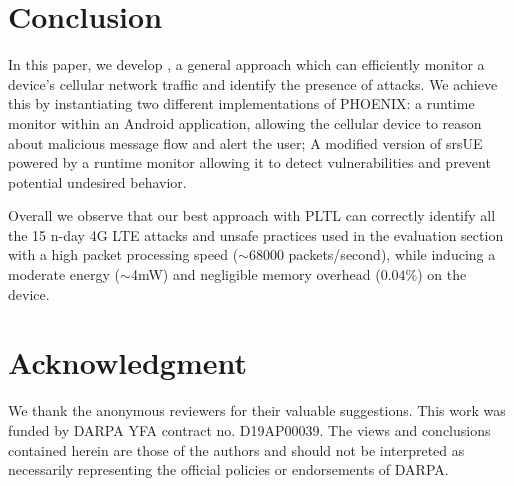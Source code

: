 \section{Conclusion}
In this paper, we develop \system, a general approach which can efficiently monitor
a device's cellular network traffic and identify the presence of attacks. We achieve
this by instantiating two different implementations
of PHOENIX: a runtime monitor within an Android application, allowing the
cellular device to reason about malicious message flow and alert the user;
A modified version of srsUE \cite{gomez2016srslte} powered by a runtime monitor
allowing it to detect vulnerabilities and prevent potential undesired behavior.

Overall we observe that our best approach with PLTL can correctly identify all the
15 n-day 4G LTE attacks and unsafe practices used in the evaluation section
with a high packet processing speed ($\sim$68000 packets/second), while inducing
a moderate energy ($\sim$4mW) and negligible memory overhead ($0.04\%$) on the device.


\section*{Acknowledgment}
We thank the anonymous reviewers for their valuable suggestions. This
work was funded by DARPA YFA contract no. D19AP00039. The views and conclusions
contained herein are those of the authors and should not be interpreted as
necessarily representing the official policies or endorsements of DARPA.
